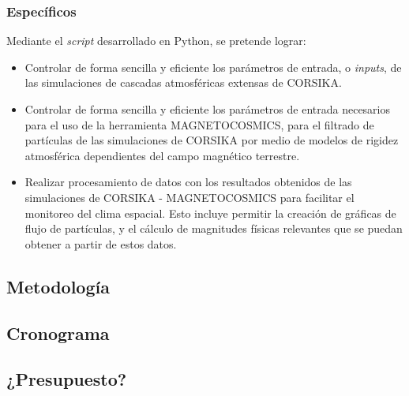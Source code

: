 \documentclass{report}
\begin{document}
\subsubsection*{Específicos}
Mediante el \textit{script} desarrollado en Python, se pretende lograr:
\begin{itemize}
    \item Controlar de forma sencilla y eficiente los parámetros de entrada, o \textit{inputs}, de las simulaciones de cascadas atmosféricas extensas de CORSIKA.
    \item Controlar de forma sencilla y eficiente los parámetros de entrada necesarios para el uso de la herramienta MAGNETOCOSMICS, para el filtrado de partículas de las simulaciones de CORSIKA por medio de modelos de rigidez atmosférica dependientes del campo magnético terrestre.
    \item Realizar procesamiento de datos con los resultados obtenidos de las simulaciones de CORSIKA - MAGNETOCOSMICS para facilitar el monitoreo del clima espacial. Esto incluye permitir la creación de gráficas de flujo de partículas, y el cálculo de magnitudes físicas relevantes que se puedan obtener a partir de estos datos.
\end{itemize}

\subsection*{Metodología}

\subsection*{Cronograma}

\subsection*{¿Presupuesto?}




\printbibliography
\end{document}

